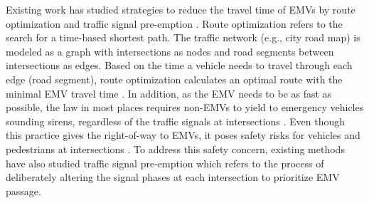 
Existing work has studied strategies to reduce the travel time of EMVs by route optimization and traffic signal pre-emption \cite{Lu2019Literature, humagain2020systematic}. Route optimization refers to the search for a time-based shortest path. The traffic network (e.g., city road map) is modeled as a graph with intersections as nodes and road segments between intersections as edges. Based on the time a vehicle needs to travel through each edge (road segment), route optimization calculates an optimal route with the minimal EMV travel time \cite{humagain2020systematic}. In addition, as the EMV needs to be as fast as possible, the law in most places requires non-EMVs to yield to emergency vehicles sounding sirens, regardless of the traffic signals at intersections \cite{de1991lights}. Even though this practice gives the right-of-way to EMVs, it poses safety risks for vehicles and pedestrians at intersections \cite{grant2017human}. To address this safety concern, existing methods \cite{nelson2000impact, qin2012control, humagain2020systematic, huang2015design} have also studied traffic signal pre-emption which refers to the process of deliberately altering the signal phases at each intersection to prioritize EMV passage.
%
%


